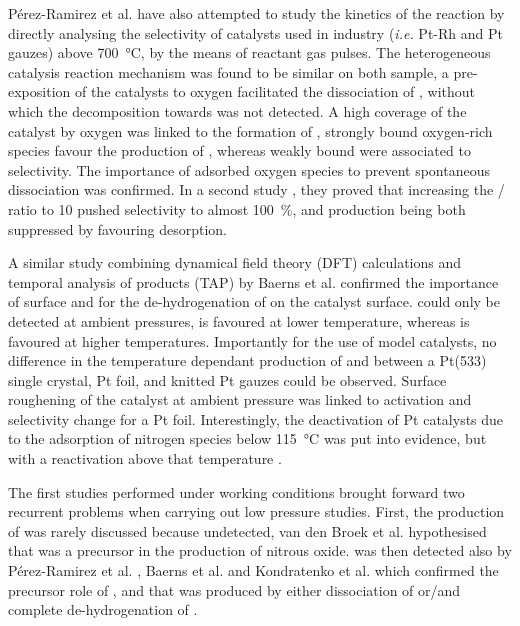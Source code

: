 Pérez-Ramirez et al. \parencite*{PerezRamirez2004} have also attempted to study the kinetics of the reaction by directly analysing the selectivity of catalysts used in industry (\textit{i.e.} Pt-Rh and Pt gauzes) above \qty{700}{\degreeCelsius}, by the means of reactant gas pulses.
The heterogeneous catalysis reaction mechanism was found to be similar on both sample, a pre-exposition of the catalysts to oxygen facilitated the dissociation of , without which the decomposition towards  was not detected.
A high coverage of the catalyst by oxygen was linked to the formation of , strongly bound oxygen-rich species favour the production of , whereas weakly bound were associated to  selectivity.
The importance of adsorbed oxygen species to prevent spontaneous  dissociation was confirmed.
In a second study \parencite{PerezRamirez2009}, they proved that increasing the / ratio to 10 pushed  selectivity to almost \qty{100}{\percent},  and  production being both suppressed by favouring  desorption.

A similar study combining dynamical field theory (DFT) calculations and temporal analysis of products (TAP) by Baerns et al. \parencite*{Baerns2005} confirmed the importance of surface  and  for the de-hydrogenation of  on the catalyst surface.
 could only be detected at ambient pressures,  is favoured at lower temperature, whereas  is favoured at higher temperatures.
Importantly for the use of model catalysts, no difference in the temperature dependant production of  and  between a Pt(533) single crystal, Pt foil, and knitted Pt gauzes could be observed.
Surface roughening of the catalyst at ambient pressure was linked to activation and selectivity change for a Pt foil.
Interestingly, the deactivation of Pt catalysts due to the adsorption of nitrogen species below \qty{115}{\degreeCelsius} was put into evidence, but with a reactivation above that temperature \parencite{Sobczyk2004}.

The first studies performed under working conditions brought forward two recurrent problems when carrying out low pressure studies.
First, the production of  was rarely discussed because undetected, van den Broek et al. \parencite*{vandenBroek1999} hypothesised that  was a precursor in the production of nitrous oxide.
 was then detected also by Pérez-Ramirez et al. \parencite*{PerezRamirez2004}, Baerns et al. \parencite*{Baerns2005} and Kondratenko et al. \parencite*{Kondratenko2007} which confirmed the precursor role of , and that  was produced by either dissociation of  or/and complete de-hydrogenation of .


